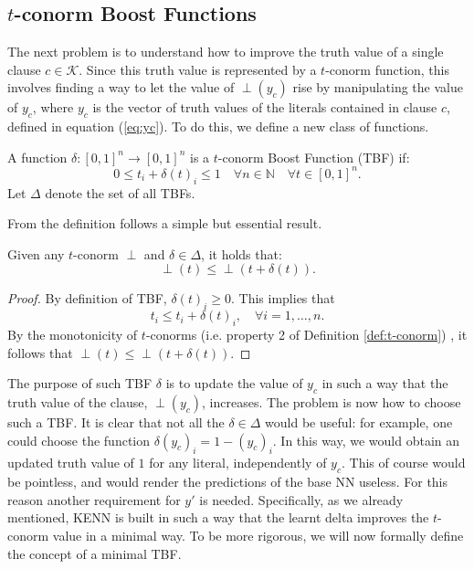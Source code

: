 \subsection{$t$-conorm Boost Functions}
The next problem is to understand how to improve the truth value of a single clause $c \in \mathcal{K}$. Since this truth value is represented by a $t$-conorm function, this involves finding a way to let the value of $\perp(y_c)$ rise by manipulating the value of $y_c$, where $y_c$ is the vector of truth values of the literals contained in clause $c$, defined in equation (\ref{eq:yc}). To do this, we define a new class of functions.

\begin{definition}
	A function $\delta:[0,1]^{n} \rightarrow[0,1]^{n}$ is a $t$-conorm Boost Function (TBF) if:
	$$
	0 \leq t_{i}+\delta(t)_{i} \leq 1  \quad \forall n \in \mathbb{N} \quad \forall t \in[0,1]^{n}.
	$$
	Let $\Delta$ denote the set of all TBFs.
\end{definition}
From the definition follows a simple but essential result.

\begin{lemma}
	Given any $t$-conorm $\perp$ and $\delta \in \Delta$, it holds that:
	$$ \perp(t) \leq \perp(t + \delta(t)).$$
\end{lemma}
\begin{proof}
	By definition of TBF, $\delta(t)_i \geq 0$. This implies that $$t_i \leq t_i + \delta(t)_i, \quad \forall i=1,\dots,n.$$By the monotonicity of $t$-conorms (i.e. property 2 of Definition \ref{def:t-conorm})
	, it follows that $\perp(t) \leq \perp(t+\delta(t))$.
\end{proof}

The purpose of such TBF $\delta$ is to update the value of $y_c$ in such a way that the truth value of the clause, $\perp\left(y_c\right)$, increases. The problem is now how to choose such a TBF. It is clear that not all the $\delta \in \Delta$ would be useful: for example, one could choose the function $\delta(y_c)_i = 1-(y_c)_i$. In this way, we would obtain an updated truth value of $1$ for any literal, independently of $y_c$. This of course would be pointless, and would render the predictions of the base NN useless. For this reason another requirement for $y'$ is needed. Specifically, as we already mentioned, KENN is built in such a way that the learnt delta improves the $t$-conorm value in a minimal way. To be more rigorous, we will now formally define the concept of a minimal TBF.

